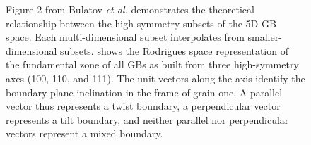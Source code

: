 \documentclass[twoside,senior]{BYUPhys}
\begin{document}
\begin{figure}[ht!]
 \centering
 \quad
 \caption[The theoretical relationship between high-symmetry subsets and fundamental zone.]{\label{fig:bulatovFig2}Figure 2 from Bulatov \emph{et al.}\cite{bulatov2014} \protect{} demonstrates the theoretical relationship between the high-symmetry subsets of the 5D GB space.  Each multi-dimensional subset interpolates from smaller-dimensional subsets. \protect{} shows the Rodrigues space representation of the fundamental zone of all GBs as built from three high-symmetry axes (\textlangle{}100\textrangle{}, \textlangle{}110\textrangle{}, and \textlangle{}111\textrangle{}).  The unit vectors along the axis identify the boundary plane inclination in the frame of grain one.  A parallel vector thus represents a twist boundary, a perpendicular vector represents a tilt boundary, and neither parallel nor perpendicular vectors represent a mixed boundary.}
\end{figure}
\end{document}
